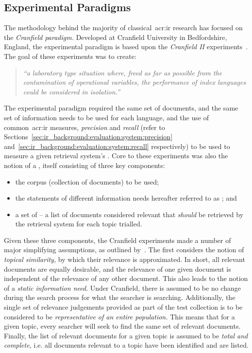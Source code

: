 \subsection{Experimental Paradigms}\label{sec:ir_background:paradigms}
The methodology behind the majority of classical~\gls{acr:ir} research has focused on the \emph{Cranfield paradigm.} Developed at Cranfield University in Bedfordshire, England, the experimental paradigm is based upon the \emph{Cranfield II} experiments~\citep{aslib1966factors}. The goal of these experiments was to create:

\begin{quote}
\emph{``a laboratory type situation where, freed as far as possible from the contamination of operational variables, the performance of index languages could be considered in isolation.''}
\end{quote}

The experimental paradigm required the same set of documents, and the same set of information needs to be used for each language, and the use of common~\gls{acr:ir} measures, \emph{precision} and \emph{recall} (refer to Sections~\ref{sec:ir_background:evaluation:system:precision} and~\ref{sec:ir_background:evaluation:system:recall} respectively) to be used to measure a given retrieval system's . Core to these experiments was also the notion of a , itself consisting of three key components:

\begin{itemize}
    \item{the corpus (collection of documents) to be used;}
    \item{the statements of different information needs hereafter referred to as ; and}
    \item{a set of  -- a list of documents considered relevant that \emph{should} be retrieved by the retrieval system for each topic trialled.}
\end{itemize}

Given these three components, the Cranfield experiments made a number of major simplifying assumptions, as outlined by~\cite{voorhees2001iir_philosophy}. The first considers the notion of \emph{topical similarity,} by which their relevance is approximated. In short, all relevant documents are equally desirable, and the relevance of one given document is independent of the relevance of any other document. This also leads to the notion of a \emph{static information need}. Under Cranfield, there is assumed to be no change during the search process for what the searcher is searching. Additionally, the single set of relevance judgements provided as part of the test collection is to be considered to be \emph{representative of an entire population.} This means that for a given topic, every searcher will seek to find the same set of relevant documents. Finally, the list of relevant documents for a given topic is assumed to be \emph{total and complete,} i.e. all documents relevant to a topic have been identified and are listed.

